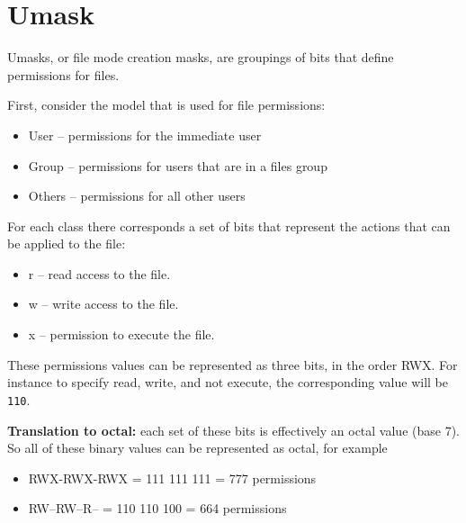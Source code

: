 
\section{Umask}

Umasks, or file mode creation masks, are groupings of bits that define
permissions for files.

First, consider the model that is used for file permissions:
\begin{itemize}
\item User -- permissions for the immediate user
\item Group -- permissions for users that are in a files group
\item Others -- permissions for all other users 
\end{itemize}
For each class there corresponds a set of bits that represent the actions that
can be applied to the file:
\begin{itemize}
\item r -- read access to the file.
\item w -- write access to the file.
\item x -- permission to execute the file.
\end{itemize}

These permissions values can be represented as three bits, in the order RWX. For
instance to specify read, write, and not execute, the corresponding value will
be \texttt{110}.

\textbf{Translation to octal:} each set of these bits is effectively an octal
value (base 7). So all of these binary values can be represented as octal, for
example
\begin{itemize}
\item RWX-RWX-RWX = 111 111 111 = 777 permissions
\item RW--RW--R-- = 110 110 100 = 664 permissions
\end{itemize}

